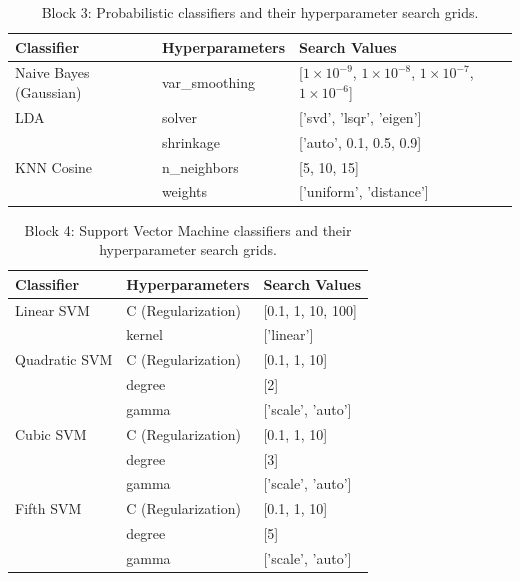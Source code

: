 \documentclass[9pt]{beamer}
\begin{document}
\begin{frame}[allowframebreaks]
    \begin{table}[htbp]
      \scriptsize
      \centering
      \caption{Block 3: Probabilistic classifiers and their hyperparameter search grids.}
      \label{tab:block3}
      \begin{tabular}{@{}l L l@{}}
      \toprule
      \textbf{Classifier} & \textbf{Hyperparameters} & \textbf{Search Values} \\
      \midrule
      Naive Bayes (Gaussian) & var\_smoothing & [$1\times10^{-9}$, $1\times10^{-8}$, $1\times10^{-7}$, $1\times10^{-6}$] \\
      \midrule
      LDA & solver & ['svd', 'lsqr', 'eigen'] \\
      & shrinkage & ['auto', 0.1, 0.5, 0.9] \\
      \midrule
      KNN Cosine & n\_neighbors & [5, 10, 15] \\
      & weights & ['uniform', 'distance'] \\
      \bottomrule
      \end{tabular}
    \end{table}

    \begin{table}[htbp]
      \scriptsize
      \centering
      \caption{Block 4: Support Vector Machine classifiers and their hyperparameter search grids.}
      \label{tab:block4}
      \begin{tabular}{@{}l L l@{}}
      \toprule
      \textbf{Classifier} & \textbf{Hyperparameters} & \textbf{Search Values} \\
      \midrule
      Linear SVM & C (Regularization) & [0.1, 1, 10, 100] \\
                 & kernel & ['linear'] \\
      \midrule
      Quadratic SVM & C (Regularization) & [0.1, 1, 10] \\
                    & degree & [2] \\
                    & gamma & ['scale', 'auto'] \\
      \midrule
      Cubic SVM & C (Regularization) & [0.1, 1, 10] \\
                & degree & [3] \\
                & gamma & ['scale', 'auto'] \\
      \midrule
      Fifth SVM & C (Regularization) & [0.1, 1, 10] \\
                & degree & [5] \\
                & gamma & ['scale', 'auto'] \\
      \bottomrule
      \end{tabular}
    \end{table}
  \end{frame}
\end{document}
